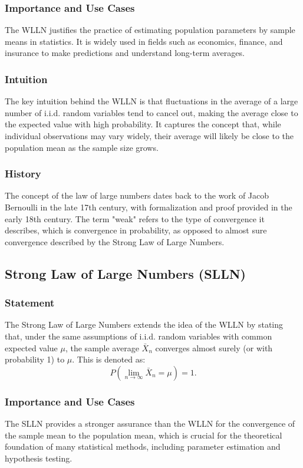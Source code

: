 \documentclass{article}
\begin{document}
\subsubsection{Importance and Use Cases}
The WLLN justifies the practice of estimating population parameters by sample means in statistics. It is widely used in fields such as economics, finance, and insurance to make predictions and understand long-term averages.

\subsubsection{Intuition}
The key intuition behind the WLLN is that fluctuations in the average of a large number of i.i.d. random variables tend to cancel out, making the average close to the expected value with high probability. It captures the concept that, while individual observations may vary widely, their average will likely be close to the population mean as the sample size grows.

\subsubsection{History}
The concept of the law of large numbers dates back to the work of Jacob Bernoulli in the late 17th century, with formalization and proof provided in the early 18th century. The term "weak" refers to the type of convergence it describes, which is convergence in probability, as opposed to almost sure convergence described by the Strong Law of Large Numbers.

\subsection{Strong Law of Large Numbers (SLLN)}

\subsubsection{Statement}
The Strong Law of Large Numbers extends the idea of the WLLN by stating that, under the same assumptions of i.i.d. random variables with common expected value \( \mu \), the sample average \( \bar{X}_n \) converges almost surely (or with probability 1) to \( \mu \). This is denoted as:
\[ P\left(\lim_{n \rightarrow \infty} \bar{X}_n = \mu\right) = 1. \]

\subsubsection{Importance and Use Cases}
The SLLN provides a stronger assurance than the WLLN for the convergence of the sample mean to the population mean, which is crucial for the theoretical foundation of many statistical methods, including parameter estimation and hypothesis testing.
\end{document}
